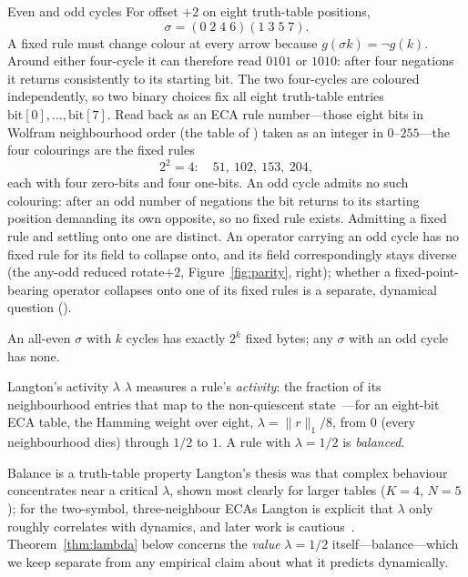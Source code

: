 \documentclass[man,12pt,floatsintext,donotrepeattitle]{apa7}
\newcommand{\sig}{\sigma}
\newcommand{\bit}[1]{\mathrm{bit}[#1]}
\newcommand{\secref}[1]{\emph{\nameref{#1}}}
\begin{document}
\begin{workedexample}[label={box:even-cycle}]{Even and odd cycles}
\small
For offset $+2$ on eight truth-table positions,
\[
\sig=(0\;2\;4\;6)(1\;3\;5\;7).
\]
A fixed rule must change colour at every arrow because
$g(\sig k)=\lnot g(k)$. Around either four-cycle it can therefore read
$0101$ or $1010$: after four negations it returns consistently to its
starting bit. The two four-cycles are coloured independently, so two binary
choices fix all eight truth-table entries $\bit{0},\dots,\bit{7}$. Read back as
an ECA rule number---those eight bits in Wolfram neighbourhood order (the table
of \secref{sec:object}) taken as an integer in $0$--$255$---the four colourings
are the fixed rules
\[
2^2=4:\quad
51,\ 102,\ 153,\ 204,
\]
each with four zero-bits and four one-bits. An odd cycle admits no such
colouring: after an odd number of negations the bit returns to its starting
position demanding its own opposite, so no fixed rule exists. Admitting a fixed
rule and settling onto one are distinct. An operator carrying an odd cycle has no
fixed rule for its field to collapse onto, and its field correspondingly stays
diverse (the any-odd reduced rotate$+2$, Figure~\ref{fig:parity}, right); whether
a fixed-point-bearing operator collapses onto one of its fixed rules is a
separate, dynamical question (\secref{sec:interrupter}).
\end{workedexample}

\begin{corollary}[label={cor:count}]
An all-even $\sig$ with $k$ cycles has exactly $2^k$ fixed bytes; any $\sig$ with
an odd cycle has none.
\end{corollary}

\begin{definition}[label={def:lambda}]{Langton's activity $\lambda$}
$\lambda$ measures a rule's \emph{activity}: the fraction of its neighbourhood
entries that map to the non-quiescent
state~\parencite{langton1990computation}---for an eight-bit ECA table, the
Hamming weight over eight, $\lambda = \lVert r \rVert_1 / 8$, from $0$ (every
neighbourhood dies) through $1/2$ to $1$. A rule with $\lambda = 1/2$ is
\emph{balanced}.
\end{definition}

\begin{observation}[label={obs:lambda}]{Balance is a truth-table property}
Langton's thesis was that complex behaviour concentrates near a critical
$\lambda$, shown most clearly for larger tables ($K=4$, $N=5$); for the
two-symbol, three-neighbour ECAs Langton is explicit that $\lambda$ only roughly
correlates with dynamics, and later work is
cautious~\parencite{mitchell1993revisiting}. Theorem~\ref{thm:lambda} below
concerns the \emph{value} $\lambda = 1/2$ itself---balance---which we keep
separate from any empirical claim about what it predicts dynamically.
\end{observation}
\end{document}
